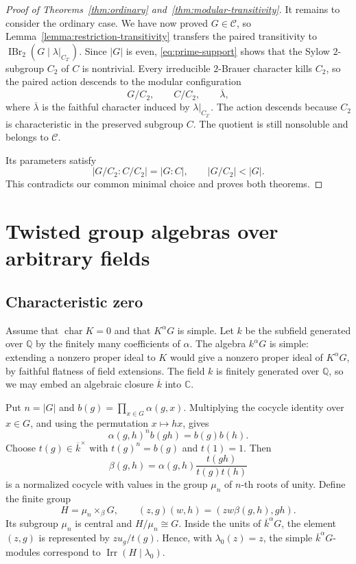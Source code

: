 \documentclass[11pt,a4paper]{amsart}
\DeclareMathOperator{\Irr}{Irr}
\DeclareMathOperator{\IBr}{IBr}
\theoremstyle{remark}
\numberwithin{equation}{section}
\begin{document}
\begin{proof}[Proof of Theorems~\ref{thm:ordinary}
and~\ref{thm:modular-transitivity}]
It remains to consider the ordinary case. We have now proved
$G\in\mathcal C$, so Lemma~\ref{lemma:restriction-transitivity}
transfers the paired transitivity to
$\IBr_2(G\mid\lambda|_{C_{2'}})$.
Since $|G|$ is even, \eqref{eq:prime-support} shows that the Sylow
$2$-subgroup $C_2$ of $C$ is nontrivial. Every irreducible $2$-Brauer
character kills $C_2$, so the paired action descends to the modular
configuration
\[
 G/C_2,\qquad C/C_2,\qquad \overline\lambda,
\]
where $\overline\lambda$ is the faithful character induced by
$\lambda|_{C_{2'}}$. The action descends because $C_2$ is characteristic
in the preserved subgroup $C$. The quotient is still nonsoluble and belongs to
$\mathcal C$.

Its parameters satisfy
\[
 |G/C_2:C/C_2|=|G:C|,\qquad |G/C_2|<|G|.
\]
This contradicts our common minimal choice and proves both theorems.
\end{proof}


\section{Twisted group algebras over arbitrary fields}
\label{sec:fields}

\subsection{Characteristic zero}

Assume that $\operatorname{char}K=0$ and that $K^\alpha G$ is simple.
Let $k$ be the subfield generated over $\mathbb Q$ by the finitely
many coefficients of $\alpha$. The algebra $k^\alpha G$ is simple:
extending a nonzero proper ideal to $K$ would give a nonzero proper
ideal of $K^\alpha G$, by faithful flatness of field extensions.
The field $k$ is finitely generated over $\mathbb Q$, so we may
embed an algebraic closure $\overline k$ into $\mathbb C$.

Put $n=|G|$ and $b(g)=\prod_{x\in G}\alpha(g,x)$.
Multiplying the cocycle identity over $x\in G$, and using the
permutation $x\mapsto hx$, gives
\[
 \alpha(g,h)^n b(gh)=b(g)b(h).
\]
Choose $t(g)\in\overline k^\times$ with $t(g)^n=b(g)$ and $t(1)=1$.
Then
\[
 \beta(g,h)=\alpha(g,h)\frac{t(gh)}{t(g)t(h)}
\]
is a normalized cocycle with values in the group $\mu_n$ of
$n$-th roots of unity. Define the finite group
\[
 H=\mu_n\times_\beta G,\qquad
 (z,g)(w,h)=(zw\beta(g,h),gh).
\]
Its subgroup $\mu_n$ is central and $H/\mu_n\cong G$.
Inside the units of $\overline k^\alpha G$, the element $(z,g)$
is represented by $z u_g/t(g)$. Hence, with
$\lambda_0(z)=z$, the simple $\overline k^\alpha G$-modules
correspond to $\Irr(H\mid\lambda_0)$.
\end{document}
